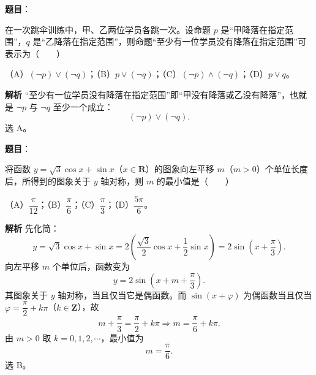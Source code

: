 \begin{answer}

\textbf{题目}：

在一次跳伞训练中，甲、乙两位学员各跳一次。设命题 $p$ 是“甲降落在指定范围”，$q$ 是“乙降落在指定范围”，则命题“至少有一位学员没有降落在指定范围”可表示为\mbox{（　　）}

（A）$(\neg p)\lor(\neg q)$；（B）$p\lor(\neg q)$；（C）$(\neg p)\land(\neg q)$；（D）$p\lor q$。

\textbf{解析}
“至少有一位学员没有降落在指定范围”即“甲没有降落或乙没有降落”，也就是 $\neg p$ 与 $\neg q$ 至少一个成立：
\nopagebreak[4]
\[(\neg p)\lor(\neg q).\]
选 A。


\end{answer}
\begin{answer}

\textbf{题目}：

将函数 $y=\sqrt3\cos x+\sin x$（$x\in\mathbf R$）的图象向左平移 $m$（$m>0$）个单位长度后，所得到的图象关于 $y$ 轴对称，则 $m$ 的最小值是\mbox{（　　）}

（A）$\dfrac{\pi}{12}$；（B）$\dfrac{\pi}{6}$；（C）$\dfrac{\pi}{3}$；（D）$\dfrac{5\pi}{6}$。

\textbf{解析}
先化简：
\nopagebreak[4]
\[y=\sqrt3\cos x+\sin x
=2\left(\frac{\sqrt3}{2}\cos x+\frac12\sin x\right)
=2\sin\left(x+\frac\pi3\right).\]
向左平移 $m$ 个单位后，函数变为
\nopagebreak[4]
\[y=2\sin\left(x+m+\frac\pi3\right).\]
其图象关于 $y$ 轴对称，当且仅当它是偶函数。而 $\sin(x+\varphi)$ 为偶函数当且仅当 $\varphi=\dfrac\pi2+k\pi$（$k\in\mathbf Z$），故
\nopagebreak[4]
\[m+\frac\pi3=\frac\pi2+k\pi\Longrightarrow m=\frac\pi6+k\pi.\]
由 $m>0$ 取 $k=0,1,2,\cdots$，最小值为
\nopagebreak[4]
\[m=\frac\pi6.\]
选 B。


\end{answer}
